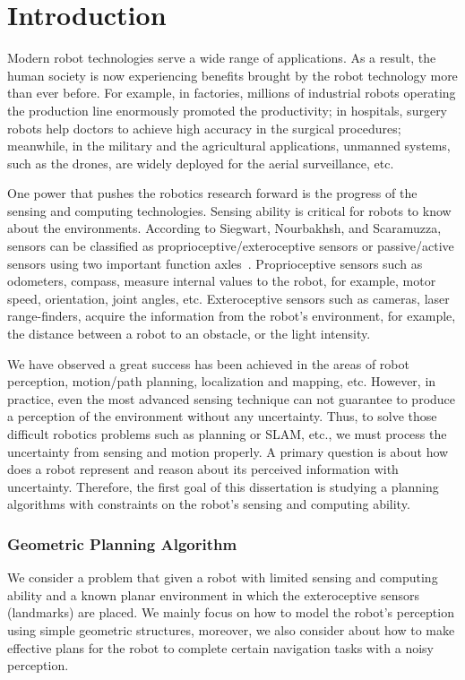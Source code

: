 \chapter{Introduction} 
\label{chp:intro}

Modern robot technologies serve a wide range of applications. 
%
As a result, the human society is now experiencing benefits brought by the robot technology more than ever before.
%
For example, in factories, millions of industrial robots operating the production line enormously promoted the productivity; 
in hospitals, surgery robots help doctors to achieve high accuracy in the surgical procedures; 
meanwhile, in the military and the agricultural applications, unmanned systems, such as the drones, are widely deployed for the aerial surveillance, etc. 


%
One power that pushes the robotics research forward is the progress of the sensing and computing technologies. 
%
Sensing ability is critical for robots to know about the environments. 
According to Siegwart, Nourbakhsh, and Scaramuzza, sensors can be classified as proprioceptive/exteroceptive sensors or passive/active sensors using two important function axles~\cite{SieNouSca11}.
%
Proprioceptive sensors such as odometers,
compass, measure internal values to the robot, for example, motor speed, orientation, joint angles, etc.
%
Exteroceptive sensors such as cameras, laser range-finders, acquire the information from the robot's environment, for example, the distance between a robot to an obstacle, or the light intensity. 

%
We have observed a great success has been achieved in the areas of robot perception, motion/path planning, localization and mapping, etc. 
%
However, in practice, even the most advanced sensing technique can not guarantee to produce a perception of the
environment without any uncertainty.  
%
Thus, to solve those difficult robotics problems such as planning or SLAM, etc., we must process the uncertainty from sensing and motion properly.
%
A primary question is about how does a robot represent and reason about its perceived information with uncertainty.
%
Therefore, the first goal of this dissertation is studying a planning algorithms with constraints on the robot's sensing and computing ability.

\subsection{Geometric Planning Algorithm}
We consider a problem that given a robot with limited sensing and computing
ability and a known planar environment in which the exteroceptive sensors (landmarks) are
placed. We mainly focus on how to model the robot's perception using simple
geometric structures, moreover, we also consider about how to make effective plans for the robot  to complete certain navigation tasks with a noisy perception.

